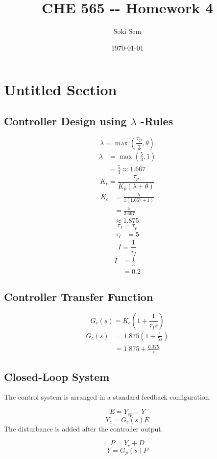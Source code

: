 \documentclass{article}%
\title{CHE 565 {-}{-} Homework 4}%
\author{Soki Sem}%
\date{\today}%
\begin{document}
%
\normalsize%
\setlength{\parindent}{0pt}%
\setlength{\parskip}{0.6em}%
\maketitle%
\section*{Untitled Section}%
\label{sec:UntitledSection}%
\subsection*{Controller Design using  $\lambda$  -Rules}%
\label{subsec:ControllerDesignusinglambda{-}Rules}%
\[%
\lambda = \max\left(\frac{\tau_p}{3}, \theta \right)%
\]%
\begin{align*}%
\lambda &= \max\left(\frac{5}{3}, 1\right) \\%
&= \frac{5}{3} \approx 1.667%
\end{align*}%
\[%
K_c = \frac{\tau_p}{K_p(\lambda + \theta)}%
\]%
\begin{align*}%
K_c &= \frac{5}{1(1.667 + 1)} \\%
&= \frac{5}{2.667} \\%
&\approx 1.875%
\end{align*}%
\[%
\tau_I = \tau_p%
\]%
\begin{align*}%
\tau_I &= 5%
\end{align*}%
\[%
I = \frac{1}{\tau_I}%
\]%
\begin{align*}%
I &= \frac{1}{5} \\%
&= 0.2%
\end{align*}

%
\subsection*{Controller Transfer Function}%
\label{subsec:ControllerTransferFunction}%
\[%
G_c(s) = K_c \left(1 + \frac{1}{\tau_I s} \right)%
\]%
\begin{align*}%
G_c(s) &= 1.875 \left(1 + \frac{1}{5s} \right) \\%
&= 1.875 + \frac{0.375}{s}%
\end{align*}

%
\subsection*{Closed{-}Loop System}%
\label{subsec:Closed{-}LoopSystem}%
The control system is arranged in a standard feedback configuration.%
\par%
\[%
E = Y_{sp} - Y%
\]%
\[%
Y_c = G_c(s)E%
\]%
The disturbance is added after the controller output.%
\par%
\[%
P = Y_c + D%
\]%
\[%
Y = G_p(s) P%
\]
\end{document}
